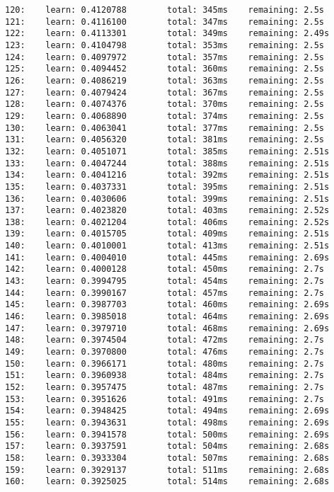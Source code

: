 \documentclass[11pt]{article}
\begin{document}
\begin{Verbatim}[commandchars=\\\{\}]
120:    learn: 0.4120788        total: 345ms    remaining: 2.5s
121:    learn: 0.4116100        total: 347ms    remaining: 2.5s
122:    learn: 0.4113301        total: 349ms    remaining: 2.49s
123:    learn: 0.4104798        total: 353ms    remaining: 2.5s
124:    learn: 0.4097972        total: 357ms    remaining: 2.5s
125:    learn: 0.4094452        total: 360ms    remaining: 2.5s
126:    learn: 0.4086219        total: 363ms    remaining: 2.5s
127:    learn: 0.4079424        total: 367ms    remaining: 2.5s
128:    learn: 0.4074376        total: 370ms    remaining: 2.5s
129:    learn: 0.4068890        total: 374ms    remaining: 2.5s
130:    learn: 0.4063041        total: 377ms    remaining: 2.5s
131:    learn: 0.4056320        total: 381ms    remaining: 2.5s
132:    learn: 0.4051071        total: 385ms    remaining: 2.51s
133:    learn: 0.4047244        total: 388ms    remaining: 2.51s
134:    learn: 0.4041216        total: 392ms    remaining: 2.51s
135:    learn: 0.4037331        total: 395ms    remaining: 2.51s
136:    learn: 0.4030606        total: 399ms    remaining: 2.51s
137:    learn: 0.4023820        total: 403ms    remaining: 2.52s
138:    learn: 0.4021204        total: 406ms    remaining: 2.52s
139:    learn: 0.4015705        total: 409ms    remaining: 2.51s
140:    learn: 0.4010001        total: 413ms    remaining: 2.51s
141:    learn: 0.4004010        total: 445ms    remaining: 2.69s
142:    learn: 0.4000128        total: 450ms    remaining: 2.7s
143:    learn: 0.3994795        total: 454ms    remaining: 2.7s
144:    learn: 0.3990167        total: 457ms    remaining: 2.7s
145:    learn: 0.3987703        total: 460ms    remaining: 2.69s
146:    learn: 0.3985018        total: 464ms    remaining: 2.69s
147:    learn: 0.3979710        total: 468ms    remaining: 2.69s
148:    learn: 0.3974504        total: 472ms    remaining: 2.7s
149:    learn: 0.3970800        total: 476ms    remaining: 2.7s
150:    learn: 0.3966171        total: 480ms    remaining: 2.7s
151:    learn: 0.3960938        total: 484ms    remaining: 2.7s
152:    learn: 0.3957475        total: 487ms    remaining: 2.7s
153:    learn: 0.3951626        total: 491ms    remaining: 2.7s
154:    learn: 0.3948425        total: 494ms    remaining: 2.69s
155:    learn: 0.3943631        total: 498ms    remaining: 2.69s
156:    learn: 0.3941578        total: 500ms    remaining: 2.69s
157:    learn: 0.3937591        total: 504ms    remaining: 2.68s
158:    learn: 0.3933304        total: 507ms    remaining: 2.68s
159:    learn: 0.3929137        total: 511ms    remaining: 2.68s
160:    learn: 0.3925025        total: 514ms    remaining: 2.68s

\end{Verbatim}
\end{document}
